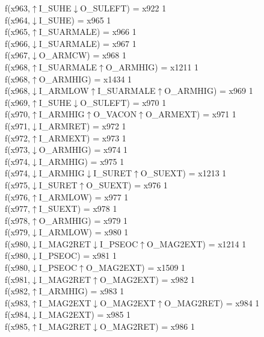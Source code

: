 f(x963,$\uparrow$I\_SUHE$\downarrow$O\_SULEFT) = x922 {1} \\
f(x964,$\downarrow$I\_SUHE) = x965 {1} \\
f(x965,$\uparrow$I\_SUARMALE) = x966 {1} \\
f(x966,$\downarrow$I\_SUARMALE) = x967 {1} \\
f(x967,$\downarrow$O\_ARMCW) = x968 {1} \\
f(x968,$\uparrow$I\_SUARMALE$\uparrow$O\_ARMHIG) = x1211 {1} \\
f(x968,$\uparrow$O\_ARMHIG) = x1434 {1} \\
f(x968,$\downarrow$I\_ARMLOW$\uparrow$I\_SUARMALE$\uparrow$O\_ARMHIG) = x969 {1} \\
f(x969,$\uparrow$I\_SUHE$\downarrow$O\_SULEFT) = x970 {1} \\
f(x970,$\uparrow$I\_ARMHIG$\uparrow$O\_VACON$\uparrow$O\_ARMEXT) = x971 {1} \\
f(x971,$\downarrow$I\_ARMRET) = x972 {1} \\
f(x972,$\uparrow$I\_ARMEXT) = x973 {1} \\
f(x973,$\downarrow$O\_ARMHIG) = x974 {1} \\
f(x974,$\downarrow$I\_ARMHIG) = x975 {1} \\
f(x974,$\downarrow$I\_ARMHIG$\downarrow$I\_SURET$\uparrow$O\_SUEXT) = x1213 {1} \\
f(x975,$\downarrow$I\_SURET$\uparrow$O\_SUEXT) = x976 {1} \\
f(x976,$\uparrow$I\_ARMLOW) = x977 {1} \\
f(x977,$\uparrow$I\_SUEXT) = x978 {1} \\
f(x978,$\uparrow$O\_ARMHIG) = x979 {1} \\
f(x979,$\downarrow$I\_ARMLOW) = x980 {1} \\
f(x980,$\downarrow$I\_MAG2RET$\downarrow$I\_PSEOC$\uparrow$O\_MAG2EXT) = x1214 {1} \\
f(x980,$\downarrow$I\_PSEOC) = x981 {1} \\
f(x980,$\downarrow$I\_PSEOC$\uparrow$O\_MAG2EXT) = x1509 {1} \\
f(x981,$\downarrow$I\_MAG2RET$\uparrow$O\_MAG2EXT) = x982 {1} \\
f(x982,$\uparrow$I\_ARMHIG) = x983 {1} \\
f(x983,$\uparrow$I\_MAG2EXT$\downarrow$O\_MAG2EXT$\uparrow$O\_MAG2RET) = x984 {1} \\
f(x984,$\downarrow$I\_MAG2EXT) = x985 {1} \\
f(x985,$\uparrow$I\_MAG2RET$\downarrow$O\_MAG2RET) = x986 {1} \\
